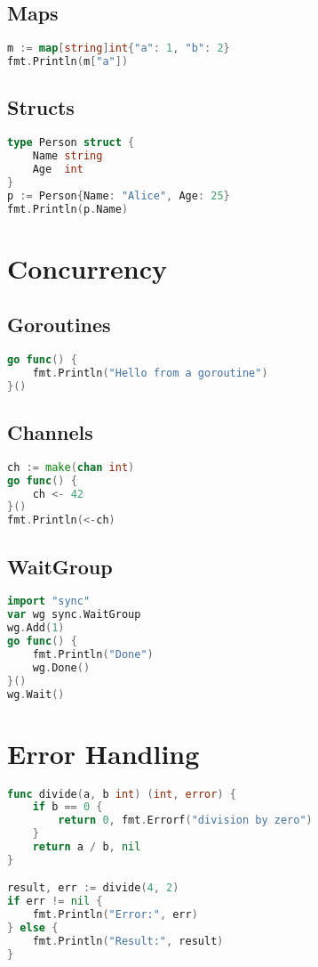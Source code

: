 \documentclass[a4paper,10pt]{article}
\begin{document}
\begin{multicols*}{2}
\subsection{Maps}
\begin{lstlisting}[language=Go]
m := map[string]int{"a": 1, "b": 2}
fmt.Println(m["a"])
\end{lstlisting}

\subsection{Structs}
\begin{lstlisting}[language=Go]
type Person struct {
    Name string
    Age  int
}
p := Person{Name: "Alice", Age: 25}
fmt.Println(p.Name)
\end{lstlisting}

\section{Concurrency}
\subsection{Goroutines}
\begin{lstlisting}[language=Go]
go func() {
    fmt.Println("Hello from a goroutine")
}()
\end{lstlisting}

\subsection{Channels}
\begin{lstlisting}[language=Go]
ch := make(chan int)
go func() {
    ch <- 42
}()
fmt.Println(<-ch)
\end{lstlisting}

\subsection{WaitGroup}
\begin{lstlisting}[language=Go]
import "sync"
var wg sync.WaitGroup
wg.Add(1)
go func() {
    fmt.Println("Done")
    wg.Done()
}()
wg.Wait()
\end{lstlisting}

\section{Error Handling}
\begin{lstlisting}[language=Go]
func divide(a, b int) (int, error) {
    if b == 0 {
        return 0, fmt.Errorf("division by zero")
    }
    return a / b, nil
}

result, err := divide(4, 2)
if err != nil {
    fmt.Println("Error:", err)
} else {
    fmt.Println("Result:", result)
}
\end{lstlisting}

\end{multicols*}
\end{document}
